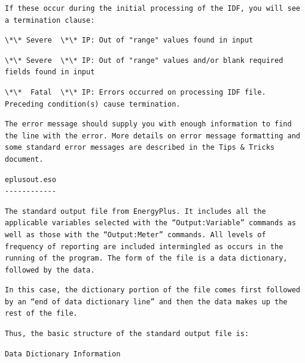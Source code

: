 \begin{lstlisting}
If these occur during the initial processing of the IDF, you will see a termination clause:
\end{lstlisting}

\begin{lstlisting}
\*\* Severe  \*\* IP: Out of "range" values found in input
\end{lstlisting}

\begin{lstlisting}
\*\* Severe  \*\* IP: Out of "range" values and/or blank required fields found in input
\end{lstlisting}

\begin{lstlisting}
\*\*  Fatal  \*\* IP: Errors occurred on processing IDF file. Preceding condition(s) cause termination.
\end{lstlisting}

\begin{lstlisting}
The error message should supply you with enough information to find the line with the error. More details on error message formatting and some standard error messages are described in the Tips & Tricks document.
\end{lstlisting}

\begin{lstlisting}
eplusout.eso
------------
\end{lstlisting}

\begin{lstlisting}
The standard output file from EnergyPlus. It includes all the applicable variables selected with the “Output:Variable” commands as well as those with the “Output:Meter” commands. All levels of frequency of reporting are included intermingled as occurs in the running of the program. The form of the file is a data dictionary, followed by the data.
\end{lstlisting}

\begin{lstlisting}
In this case, the dictionary portion of the file comes first followed by an “end of data dictionary line” and then the data makes up the rest of the file.
\end{lstlisting}

\begin{lstlisting}
Thus, the basic structure of the standard output file is:
\end{lstlisting}

\begin{lstlisting}
Data Dictionary Information
\end{lstlisting}


